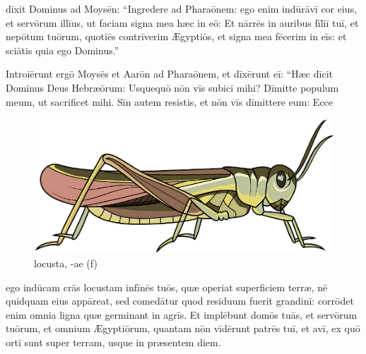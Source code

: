 

\thispagestyle{empty}

 dīxit Dominus ad Moysēn: ``Ingredere ad Pharaōnem: ego enim indūrāvī cor eius, et servōrum illīus, ut faciam signa mea hæc in eō:
Et nārrēs in auribus fīliī tuī, et nepōtum tuōrum,
quotiēs contrīverim Ægyptiōs, et signa mea fēcerim in eīs:
et sciātis quia ego Dominus.''

Introiērunt ergō
Moysēs et Aarōn ad Pharaōnem, et dīxērunt eī: ``Hæc dīcit
Dominus Deus Hebræōrum: Usquequō nōn vīs
subicī mihi? Dīmitte populum meum, ut
sacrificet mihi. Sīn autem resistis, et nōn vīs dīmittere eum: Ecce
\begin{figure}[ht]
    \centering
    \includegraphics{locusta}
    \caption{locusta, -ae (f)}
\end{figure}%
ego indūcam crās locustam in\linebreak fīnēs tuōs, quæ operiat
superficiem terræ, nē quidquam eius appāreat, sed
comedātur quod residuum
fuerit grandinī: corrōdet enim omnia ligna quæ
germinant in agrīs. Et implēbunt domōs tuās, et servōrum
tuōrum, et omnium Ægyptiōrum, quantam nōn vīdērunt patrēs tuī, et avī, ex
quō ortī sunt super terram, usque in præsentem diem. 


